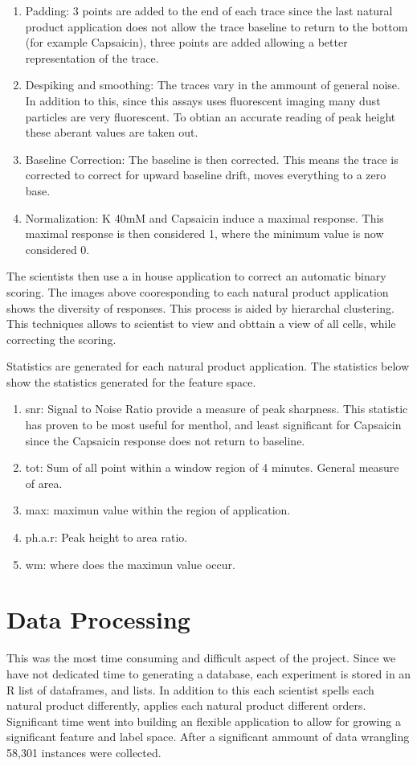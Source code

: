\documentclass[11pt, fullpage,letterpaper]{article}
\begin{document}
\begin{enumerate}
	\item Padding: 3 points are added to the end of each trace since the last natural product application does not allow the trace baseline to return  to the bottom (for example Capsaicin), three points are added allowing a better representation of the trace.
	\item Despiking and smoothing: The traces vary in the ammount of general noise.  In addition to this, since this assays uses fluorescent imaging many dust particles are very fluorescent.  To obtian an accurate reading of peak height these aberant values are taken out. 
	\item Baseline Correction: The baseline is then corrected. This means the trace is corrected to correct for upward baseline drift, moves everything to a zero base.
	\item Normalization: K 40mM and Capsaicin induce a maximal response. This maximal response is then considered 1, where the minimum value is now considered 0.

\end{enumerate}
The scientists then use a in house application to correct an automatic binary scoring. The images above cooresponding to each natural product application shows the diversity of responses. This process is aided by hierarchal clustering. This techniques allows to scientist to view and obttain a view of all cells, while correcting the scoring.

Statistics are generated for each natural product application. The statistics below show the statistics generated for the feature space.

\begin{enumerate}
\item snr: Signal to Noise Ratio provide a measure of peak sharpness.  This statistic has proven to be most useful for menthol, and least significant for Capsaicin since the Capsaicin response does not return to baseline.
\item tot: Sum of all point within a window region of 4 minutes. General measure of area.
\item max: maximun value within the region of application.
\item ph.a.r: Peak height to area ratio.
\item wm: where does the maximun value occur.
\end{enumerate}

\section{Data Processing}
This was the most time consuming and difficult aspect of the project. Since we have not dedicated time to generating a database, each experiment is stored in an R list of dataframes, and lists.  In addition to this each scientist spells each natural product differently, applies each natural product different orders. Significant time went into building an flexible application to allow for growing a significant feature and label space. After a significant ammount of data wrangling 58,301 instances were collected.
\end{document}
